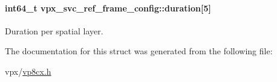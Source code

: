 \paragraph[{\texorpdfstring{duration}{duration}}]{\setlength{\rightskip}{0pt plus 5cm}int64\+\_\+t vpx\+\_\+svc\+\_\+ref\+\_\+frame\+\_\+config\+::duration\mbox{[}5\mbox{]}}\hypertarget{structvpx__svc__ref__frame__config_ab089b385aaa31730b1c1f7ad08f0e1f6}{}\label{structvpx__svc__ref__frame__config_ab089b385aaa31730b1c1f7ad08f0e1f6}
Duration per spatial layer. 

The documentation for this struct was generated from the following file\+:\begin{DoxyCompactItemize}
\item 
vpx/\hyperlink{vp8cx_8h}{vp8cx.\+h}\end{DoxyCompactItemize}
